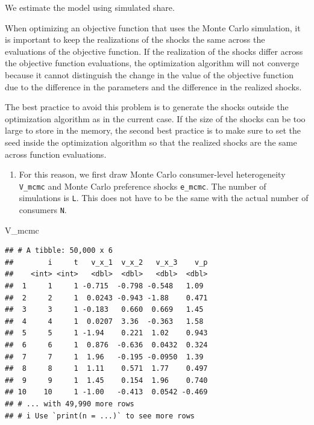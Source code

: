 \documentclass[
]{book}
\newenvironment{Shaded}{\begin{snugshade}}{\end{snugshade}}
\newcommand{\NormalTok}[1]{#1}
\providecommand{\tightlist}{%
  \setlength{\itemsep}{0pt}\setlength{\parskip}{0pt}}
\begin{document}
We estimate the model using simulated share.

When optimizing an objective function that uses the Monte Carlo simulation, it is important to keep the realizations of the shocks the same across the evaluations of the objective function. If the realization of the shocks differ across the objective function evaluations, the optimization algorithm will not converge because it cannot distinguish the change in the value of the objective function due to the difference in the parameters and the difference in the realized shocks.

The best practice to avoid this problem is to generate the shocks outside the optimization algorithm as in the current case. If the size of the shocks can be too large to store in the memory, the second best practice is to make sure to set the seed inside the optimization algorithm so that the realized shocks are the same across function evaluations.

\begin{enumerate}
\def\labelenumi{\arabic{enumi}.}
\setcounter{enumi}{1}
\tightlist
\item
  For this reason, we first draw Monte Carlo consumer-level heterogeneity \texttt{V\_mcmc} and Monte Carlo preference shocks \texttt{e\_mcmc}. The number of simulations is \texttt{L}. This does not have to be the same with the actual number of consumers \texttt{N}.
\end{enumerate}

\begin{Shaded}
\begin{Highlighting}[]
\NormalTok{V\_mcmc}
\end{Highlighting}
\end{Shaded}

\begin{verbatim}
## # A tibble: 50,000 x 6
##        i     t   v_x_1  v_x_2   v_x_3    v_p
##    <int> <int>   <dbl>  <dbl>   <dbl>  <dbl>
##  1     1     1 -0.715  -0.798 -0.548   1.09 
##  2     2     1  0.0243 -0.943 -1.88    0.471
##  3     3     1 -0.183   0.660  0.669   1.45 
##  4     4     1  0.0207  3.36  -0.363   1.58 
##  5     5     1 -1.94    0.221  1.02    0.943
##  6     6     1  0.876  -0.636  0.0432  0.324
##  7     7     1  1.96   -0.195 -0.0950  1.39 
##  8     8     1  1.11    0.571  1.77    0.497
##  9     9     1  1.45    0.154  1.96    0.740
## 10    10     1 -1.00   -0.413  0.0542 -0.469
## # ... with 49,990 more rows
## # i Use `print(n = ...)` to see more rows
\end{verbatim}
\end{document}
